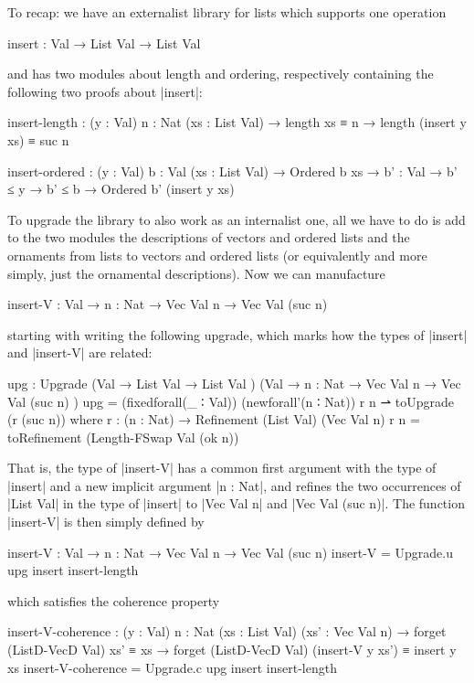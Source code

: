 To recap: we have an externalist library for lists which supports one operation
\begin{code}
insert : Val → List Val → List Val
\end{code}
and has two modules about length and ordering, respectively containing the following two proofs about |insert|:
\begin{code}
insert-length   :  (y : Val) {n : Nat} (xs : List Val) →
                   length xs ≡ n → length (insert y xs) ≡ suc n
                 
insert-ordered  :  (y : Val) {b : Val} (xs : List Val) → Ordered b xs →
                   {b' : Val} → b' ≤ y → b' ≤ b → Ordered b' (insert y xs)
\end{code}
To upgrade the library to also work as an internalist one, all we have to do is add to the two modules the descriptions of vectors and ordered lists and the ornaments from lists to vectors and ordered lists (or equivalently and more simply, just the ornamental descriptions).
Now we can manufacture
\begin{code}
insert-V :  Val → {n : Nat} → Vec Val n → Vec Val (suc n)
\end{code}
starting with writing the following upgrade, which marks how the types of |insert| and |insert-V| are related:
\begin{code}
upg : Upgrade  (Val →              List  Val    → List  Val          )
               (Val → {n : Nat} →  Vec   Val n  → Vec   Val (suc n)  )
upg = (fixedforall(_ ∶ Val)) (newforall'(n ∶ Nat)) r n ⇀ toUpgrade (r (suc n))
  where  r : (n : Nat) → Refinement (List Val) (Vec Val n)
         r n = toRefinement (Length-FSwap Val (ok n))
\end{code}
That is, the type of |insert-V| has a common first argument with the type of |insert| and a new implicit argument |n : Nat|, and refines the two occurrences of |List Val| in the type of |insert| to |Vec Val n| and |Vec Val (suc n)|.
The function |insert-V| is then simply defined by
\begin{code}
insert-V :  Val → {n : Nat} → Vec Val n → Vec Val (suc n)
insert-V = Upgrade.u upg insert insert-length
\end{code}
which satisfies the coherence property
\begin{code}
insert-V-coherence :
  (y : Val) {n : Nat} (xs : List Val) (xs' : Vec Val n) →
  forget (ListD-VecD Val) xs' ≡ xs →
  forget (ListD-VecD Val) (insert-V y xs') ≡ insert y xs
insert-V-coherence = Upgrade.c upg insert insert-length
\end{code}
